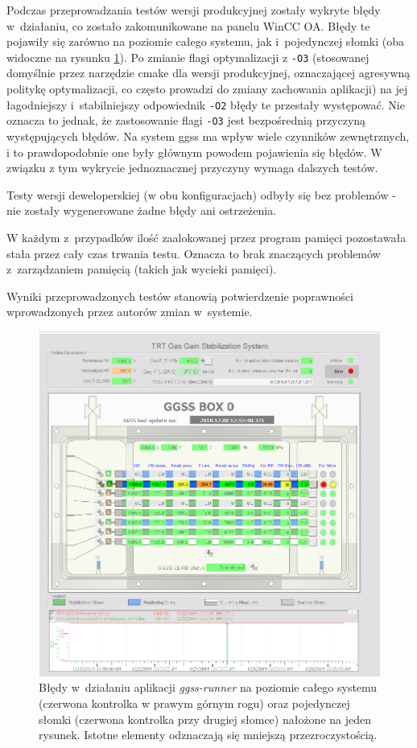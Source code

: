 Podczas przeprowadzania testów wersji produkcyjnej zostały wykryte błędy w~działaniu, co zostało zakomunikowane na panelu WinCC OA. Błędy te pojawiły się zarówno na poziomie całego systemu, jak i~pojedynczej słomki (oba widoczne na rysunku \ref{fig:ggssErrorScada}). Po zmianie flagi optymalizacji z \lstinline{-O3} (stosowanej domyślnie przez narzędzie \gls*{cmake} dla wersji produkcyjnej, oznaczającej agresywną politykę optymalizacji, co często prowadzi do zmiany zachowania aplikacji) na jej łagodniejszy i~stabilniejszy odpowiednik \lstinline{-O2} błędy te przestały występować. Nie oznacza to jednak, że zastosowanie flagi \lstinline{-O3} jest bezpośrednią przyczyną występujących błędów. Na system \gls*{ggss} ma wpływ wiele czynników zewnętrznych, i to prawdopodobnie one były głównym powodem pojawienia się błędów. W związku z tym wykrycie jednoznacznej przyczyny wymaga dalszych testów.

Testy wersji deweloperskiej (w obu konfiguracjach) odbyły się bez problemów - nie zostały wygenerowane żadne błędy ani ostrzeżenia. 

W każdym z~przypadków ilość zaalokowanej przez program pamięci pozostawała stała przez cały czas trwania testu. Oznacza to brak znaczących problemów z~zarządzaniem pamięcią (takich jak wycieki pamięci).

Wyniki przeprowadzonych testów stanowią potwierdzenie poprawności wprowadzonych przez autorów zmian w~systemie. 

\begin{figure}
\centering
\includegraphics[width=\textwidth]{res/png/ggssErrors}
\caption{Błędy w~działaniu aplikacji \textit{ggss-runner} na poziomie całego systemu (czerwona kontrolka w prawym górnym rogu) oraz pojedynczej słomki (czerwona kontrolka przy drugiej słomce) nałożone na jeden rysunek. Istotne elementy odznaczają się mniejszą przezroczystością.}
\label{fig:ggssErrorScada}
\end{figure}

